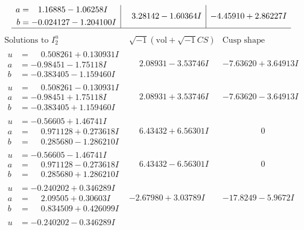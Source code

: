 \documentclass[1p]{elsarticle_modified}
\theoremstyle{definition}
\newcommand{\I}{\sqrt{-1}}
\begin{document}
$$\begin{array}{c|c|c}
\begin{aligned}
a &= \phantom{-}1.16885 - 1.06258 I \\
b &= -0.024127 - 1.204100 I\end{aligned}
 & \phantom{-}3.28142 - 1.60364 I & -4.45910 + 2.86227 I\\
 \hline 
 \end{array}$$\newpage$$\begin{array}{c|c|c}  
\text{Solutions to }I^u_{2}& \I (\text{vol} + \sqrt{-1}CS) & \text{Cusp shape}\\
 \hline 
\begin{aligned}
u &= \phantom{-}0.508261 + 0.130931 I \\
a &= -0.98451 - 1.75118 I \\
b &= -0.383405 - 1.159460 I\end{aligned}
 & \phantom{-}2.08931 - 3.53746 I & -7.63620 + 3.64913 I \\ \hline\begin{aligned}
u &= \phantom{-}0.508261 - 0.130931 I \\
a &= -0.98451 + 1.75118 I \\
b &= -0.383405 + 1.159460 I\end{aligned}
 & \phantom{-}2.08931 + 3.53746 I & -7.63620 - 3.64913 I \\ \hline\begin{aligned}
u &= -0.56605 + 1.46741 I \\
a &= \phantom{-}0.971128 + 0.273618 I \\
b &= \phantom{-}0.285680 - 1.286210 I\end{aligned}
 & \phantom{-}6.43432 + 6.56301 I & \phantom{-0.000000 } 0 \\ \hline\begin{aligned}
u &= -0.56605 - 1.46741 I \\
a &= \phantom{-}0.971128 - 0.273618 I \\
b &= \phantom{-}0.285680 + 1.286210 I\end{aligned}
 & \phantom{-}6.43432 - 6.56301 I & \phantom{-0.000000 } 0 \\ \hline\begin{aligned}
u &= -0.240202 + 0.346289 I \\
a &= \phantom{-}2.09505 + 0.30603 I \\
b &= \phantom{-}0.834509 + 0.426099 I\end{aligned}
 & -2.67980 + 3.03789 I & -17.8249 - 5.9672 I \\ \hline\begin{aligned}
u &= -0.240202 - 0.346289 I \\

\end{aligned}
\end{array}$$
\end{document}
